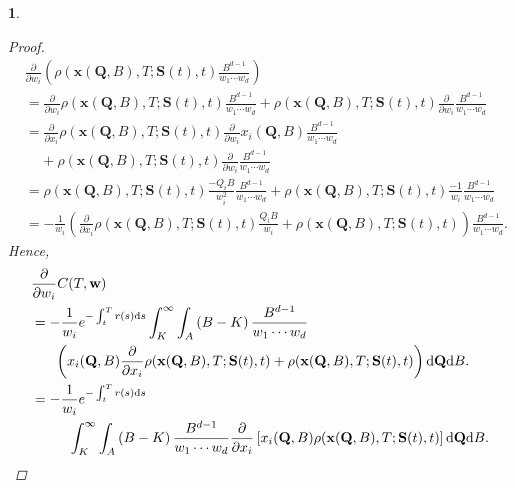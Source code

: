 \documentclass[english]{article}
\numberwithin{equation}{section}
\numberwithin{figure}{section}
\theoremstyle{bolddescit}
\newtheorem{theorem}{\protect\theoremname}[section]
\theoremstyle{definition}
\theoremstyle{definition}
\theoremstyle{plain}
\theoremstyle{plain}
\theoremstyle{bolddesc}
\theoremstyle{plain}
\theoremstyle{remark}
\providecommand{\theoremname}{Theorem}
\begin{document}
\begin{theorem}
\begin{proof}
\begin{align*}
      &\frac{\partial}{\partial w_i} \left(\rho(\mathbf{x}(\mathbf{Q},B),T;\mathbf{S}(t),t) \frac{B^{d-1}}{w_1 \cdots w_d}\right)\\
      &= \frac{\partial}{\partial w_i} \rho(\mathbf{x}(\mathbf{Q},B),T;\mathbf{S}(t),t) \frac{B^{d-1}}{w_1 \cdots w_d}
        + \rho(\mathbf{x}(\mathbf{Q},B),T;\mathbf{S}(t),t) \frac{\partial}{\partial w_i} \frac{B^{d-1}}{w_1 \cdots w_d}\\
      &= \frac{\partial}{\partial x_i} \rho(\mathbf{x}(\mathbf{Q},B),T;\mathbf{S}(t),t) \frac{\partial}{\partial w_i} x_i(\mathbf{Q},B) \frac{B^{d-1}}{w_1 \cdots w_d}\\
        &\ \ \ \ \ + \rho(\mathbf{x}(\mathbf{Q},B),T;\mathbf{S}(t),t) \frac{\partial}{\partial w_i} \frac{B^{d-1}}{w_1 \cdots w_d} \\
      &= \rho(\mathbf{x}(\mathbf{Q},B),T;\mathbf{S}(t),t) \frac{-Q_i B}{w_i^2} \frac{B^{d-1}}{w_1 \cdots w_d}
        + \rho(\mathbf{x}(\mathbf{Q},B),T;\mathbf{S}(t),t) \frac{-1}{w_i} \frac{B^{d-1}}{w_1 \cdots w_d}\\
      &= -\frac{1}{w_i} \left(\frac{\partial}{\partial x_i} \rho(\mathbf{x}(\mathbf{Q},B),T;\mathbf{S}(t),t) \frac{Q_i B}{w_i}
        + \rho(\mathbf{x}(\mathbf{Q},B),T;\mathbf{S}(t),t)\right) \frac{B^{d-1}}{w_1 \cdots w_d}.
    \end{align*}
    Hence,
    \begin{align}
      &\frac{\partial}{\partial w_i} C(T,\mathbf{w})\notag\\
      &= - \frac{1}{w_i}e^{-\int_t^T r(s) \mathrm{d}s}\int_K^\infty \int_A \left(B - K\right) \frac{B^{d-1}}{w_1 \cdots w_d}\notag\\
        &\ \ \ \ \ \left(x_i(\mathbf{Q},B)\frac{\partial}{\partial x_i} \rho(\mathbf{x}(\mathbf{Q},B),T;\mathbf{S}(t),t) + \rho(\mathbf{x}(\mathbf{Q},B),T;\mathbf{S}(t),t)\right) \mathrm{d}\mathbf{Q} \mathrm{d}B.\notag\\
      &= - \frac{1}{w_i}e^{-\int_t^T r(s) \mathrm{d}s}\notag\\
      &\ \ \ \ \ \ \ \ \int_K^\infty \int_A \left(B - K\right) \frac{B^{d-1}}{w_1 \cdots w_d}
         \frac{\partial}{\partial x_i}\left[x_i(\mathbf{Q},B) \rho(\mathbf{x}(\mathbf{Q},B),T;\mathbf{S}(t),t) \right] \mathrm{d}\mathbf{Q} \mathrm{d}B.\label{eq:generalisation-dC-dw}
    \end{align}


\end{proof}
\end{theorem}
\end{document}
